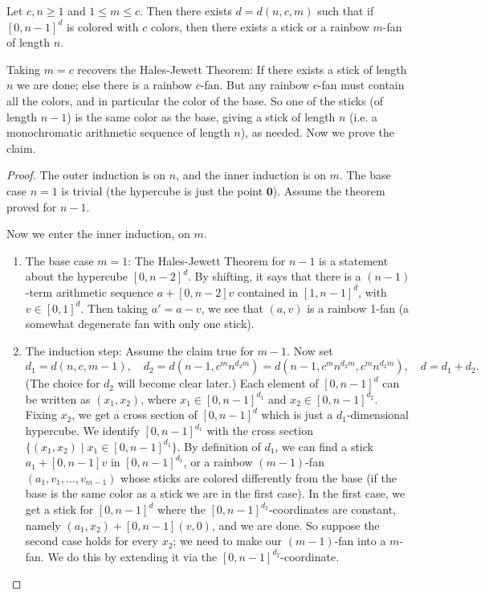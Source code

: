\begin{clm}
Let $c,n\geq 1$ and $1\leq m\leq c$. Then there exists $d=d(n,c,m)$ such that if $[0,n-1]^d$ is colored with $c$ colors, then there exists a stick or a rainbow $m$-fan of length $n$.
\end{clm}
Taking $m=c$ recovers the Hales-Jewett Theorem: If there exists a stick of length $n$ we are done; else there is a rainbow $c$-fan. But any rainbow $c$-fan must contain all the colors, and in particular the color of the base. So one of the sticks (of length $n-1$) is the same color as the base, giving a stick of length $n$ (i.e. a monochromatic arithmetic sequence of length $n$), as needed. Now we prove the claim.

\begin{proof}
The outer induction is on $n$, and the inner induction is on $m$. The base case $n=1$ is trivial (the hypercube is just the point $\mathbf 0$). Assume the theorem proved for $n-1$.

Now we enter the inner induction, on $m$.
\begin{enumerate}
\item
The base case $m=1$: The Hales-Jewett Theorem for $n-1$ is a statement about the hypercube $[0,n-2]^d$. By shifting, it says that there is a $(n-1)$-term arithmetic sequence $a+[0,n-2]v$ contained in $[1,n-1]^d$, with $v\in [0,1]^d$. Then taking $a'=a-v$, we see that $(a,v)$ is a rainbow 1-fan (a somewhat degenerate fan with only one stick).
\item
The induction step: Assume the claim true for $m-1$. Now set
\[d_1=d(n,c,m-1),\quad d_2=d(n-1,c^mn^{d_2m})=d(n-1,c^mn^{d_2m},c^mn^{d_2m}), \quad d=d_1+d_2.\]
(The choice for $d_2$ will become clear later.) 
Each element of $[0,n-1]^d$ can be written as $(x_1,x_2)$, where $x_1\in [0,n-1]^{d_1}$ and $x_2\in [0,n-1]^{d_2}$. Fixing $x_2$, we get a cross section of $[0,n-1]^d$ which is just a $d_1$-dimensional hypercube.
We identify $[0,n-1]^{d_1}$ with the cross section $\{(x_1,x_2)\mid x_1\in [0,n-1]^{d_1}\}$.
By definition of $d_1$, we can find a stick $a_1+[0,n-1]v$ in $[0,n-1]^{d_1}$, or a rainbow $(m-1)$-fan $(a_1,v_1,\ldots, v_{m-1})$ whose sticks are colored differently from the base (if the base is the same color as a stick we are in the first case). In the first case, we get a stick for $[0,n-1]^d$ where the $[0,n-1]^{d_2}$-coordinates are constant, namely $(a_1,x_2)+[0,n-1](v,0)$, and we are done. So suppose the second case holds for every $x_2$; we need to make our $(m-1)$-fan into a $m$-fan. We do this by extending it via the $[0,n-1]^{d_2}$-coordinate.


\end{enumerate}
\end{proof}
